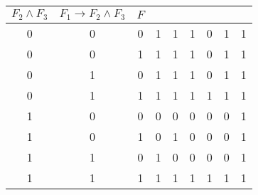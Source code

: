 \begin{exer}[1.2]
\begin{enumerate}[label=(\alph*)]
\begin{center}
\begin{tabular}{ |c|c|c||c|c|c|c|c|c| }
                                $F_2 \land F_3$ & $F_1 \rightarrow F_2 \land F_3$ & $F$ \\
                    \hline
                        0 & 0 & 0 & 1 & 1 & 1 & 0 & 1 & 1  \\
                    \hline
                        0 & 0 & 1 & 1 & 1 & 1 & 0 & 1 & 1  \\
                    \hline
                        0 & 1 & 0 & 1 & 1 & 1 & 0 & 1 & 1  \\
                    \hline
                        0 & 1 & 1 & 1 & 1 & 1 & 1 & 1 & 1  \\
                    \hline
                        1 & 0 & 0 & 0 & 0 & 0 & 0 & 0 & 1  \\
                    \hline
                        1 & 0 & 1 & 0 & 1 & 0 & 0 & 0 & 1  \\
                    \hline
                        1 & 1 & 0 & 1 & 0 & 0 & 0 & 0 & 1  \\
                    \hline
                        1 & 1 & 1 & 1 & 1 & 1 & 1 & 1 & 1  \\
                    \hline
                \end{tabular}
            \end{center}
    \end{enumerate}
\end{exer}

